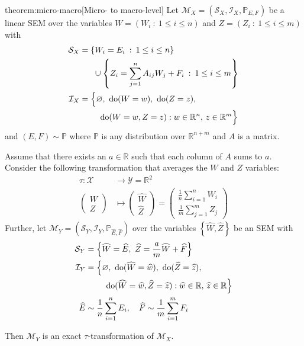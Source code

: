 \begin{reptheorem}{theorem:micro-macro}[Micro- to macro-level]
Let ${\mathcal{M}_X = \left(\mathcal{S}_X, \mathcal{I}_X, \mathbb{P}_{E,F} \right)}$ be a linear SEM over the variables ${W=\left( W_i \: : \: 1\leq  i \leq n \right)}$ and ${Z=\left( Z_i \: : \: 1\leq  i \leq m \right)}$ with
%
\begin{align*}
\mathcal{S}_X &= \left\lbrace W_i = E_i \:  : \: 1 \leq i \leq n  \right\rbrace \\
& \quad \ \  \cup \left\lbrace Z_i = \sum_{j=1}^n A_{ij}W_j  + F_{i} \:  : \: 1\leq i \leq m \right\rbrace \\
%
\mathcal{I}_X &= \Big{\{} \nulli, \ \doop(W= w), \ \doop(Z= z), \\
& \qquad\ \doop(W= w, Z= z ) :   w \in \mathbb{R}^{n}, \, z \in \mathbb{R}^m \Big{\}}
%
\end{align*}
%
and $(E,F)  \sim \mathbb{P}$ where $\mathbb{P}$ is any distribution over $\mathbb{R}^{n+m}$ and $A$ is a matrix.

Assume that there exists an $a\in \mathbb{R}$ such that each column of $A$ sums to $a$. Consider the following transformation that averages the $W$ and $Z$ variables:
%
\begin{align*}
\tau : \mathcal{X} &\rightarrow \mathcal{Y} = \mathbb{R}^2 \\
\begin{pmatrix} W \\ Z \end{pmatrix} &\mapsto \begin{pmatrix} \widehat{W} \\ \widehat{Z} \end{pmatrix} = \begin{pmatrix} \frac{1}{n}\sum_{i=1}^n W_i \\ \frac{1}{m}\sum_{j=1}^m Z_j  \end{pmatrix}
\end{align*}
%
Further, let $\mathcal{M}_Y = \left(\mathcal{S}_Y, \mathcal{I}_Y, \mathbb{P}_{\widehat{E},\widehat{F}} \right)$ over the variables ${\left\lbrace \widehat{W}, \widehat{Z} \right\rbrace}$ be an SEM with
%
\begin{align*}
\mathcal{S}_Y &= \Big\lbrace \widehat{W} = \widehat{E}, \ \widehat{Z} = \frac{a}{m}\widehat{W} + \widehat{F} \Big\rbrace \\
%
\mathcal{I}_Y &= \Big{\{} \nulli,\ \doop(\widehat{W}= \widehat{w}), \ \doop(\widehat{Z}= \widehat{z}), \\
& \qquad\ \doop(\widehat{W}= \widehat{w}, \widehat{Z}= \widehat{z} ) :   \widehat{w} \in \mathbb{R}, \, \widehat{z} \in \mathbb{R} \Big{\}} \\
%
\widehat{E}  & \sim \frac{1}{n}\sum_{i=1}^{n} E_i, \quad
\widehat{F}  \sim \frac{1}{m}\sum_{i=1}^{m} F_i
\end{align*}

Then $\mathcal{M}_Y$ is an exact $\tau$-transformation of $\mathcal{M}_X$.
\end{reptheorem}

